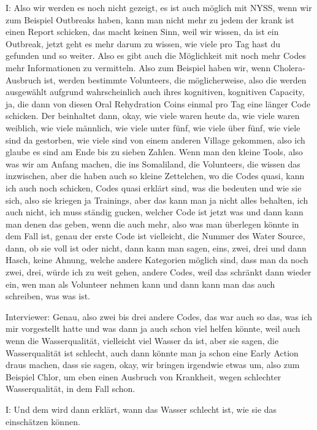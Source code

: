 I: Also wir werden es noch nicht gezeigt, es ist auch m{\"o}glich mit NYSS, wenn wir zum Beispiel Outbreaks haben, kann man nicht mehr zu jedem der krank ist einen Report schicken, das macht keinen Sinn, weil wir wissen, da ist ein Outbreak, jetzt geht es mehr darum zu wissen, wie viele pro Tag hast du gefunden und so weiter. Also es gibt auch die M{\"o}glichkeit mit noch mehr Codes mehr Informationen zu vermitteln. Also zum Beispiel haben wir, wenn Cholera-Ausbruch ist, werden bestimmte Volunteers, die m{\"o}glicherweise, also die werden ausgew{\"a}hlt aufgrund wahrscheinlich auch ihres kognitiven, kognitiven Capacity, ja, die dann von diesen Oral Rehydration Coins einmal pro Tag eine l{\"a}nger Code schicken. Der beinhaltet dann, okay, wie viele waren heute da, wie viele waren weiblich, wie viele m{\"a}nnlich, wie viele unter f{\"u}nf, wie viele {\"u}ber f{\"u}nf, wie viele sind da gestorben, wie viele sind von einem anderen Village gekommen, also ich glaube es sind am Ende bis zu sieben Zahlen. Wenn man den kleine Tools, also was wir am Anfang machen, die ins Somaliland, die Volunteers, die wissen das inzwischen, aber die haben auch so kleine Zettelchen, wo die Codes quasi, kann ich auch noch schicken, Codes quasi erkl{\"a}rt sind, was die bedeuten und wie sie sich, also sie kriegen ja Trainings, aber das kann man ja nicht alles behalten, ich auch nicht, ich muss st{\"a}ndig gucken, welcher Code ist jetzt was und dann kann man denen das geben, wenn die auch mehr, also was man {\"u}berlegen k{\"o}nnte in dem Fall ist, genau der erste Code ist vielleicht, die Nummer des Water Source, dann, ob sie voll ist oder nicht, dann kann man sagen, eins, zwei, drei und dann Hasch, keine Ahnung, welche andere Kategorien m{\"o}glich sind, dass man da noch zwei, drei, w{\"u}rde ich zu weit gehen, andere Codes, weil das schr{\"a}nkt dann wieder ein, wen man als Volunteer nehmen kann und dann kann man das auch schreiben, was was ist. 

Interviewer: Genau, also zwei bis drei andere Codes, das war auch so das, was ich mir vorgestellt hatte und was dann ja auch schon viel helfen k{\"o}nnte, weil auch wenn die Wasserqualit{\"a}t, vielleicht viel Wasser da ist, aber sie sagen, die Wasserqualit{\"a}t ist schlecht, auch dann k{\"o}nnte man ja schon eine Early Action draus machen, dass sie sagen, okay, wir bringen irgendwie etwas um, also zum Beispiel Chlor, um eben einen Ausbruch von Krankheit, wegen schlechter Wasserqualit{\"a}t, in dem Fall schon. 

I: Und dem wird dann erkl{\"a}rt, wann das Wasser schlecht ist, wie sie das einsch{\"a}tzen k{\"o}nnen. 


